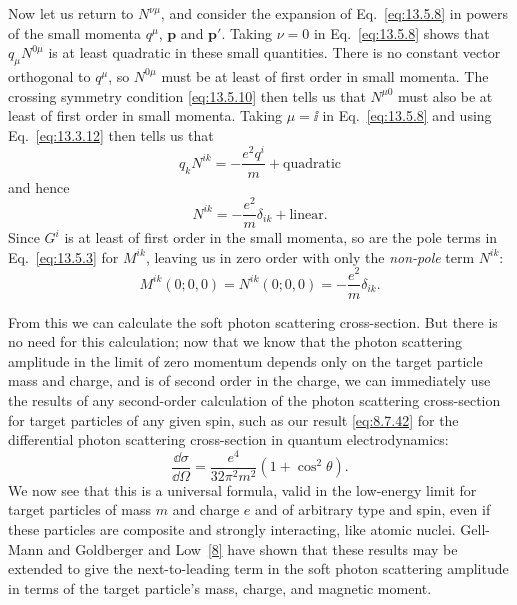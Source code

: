 Now let us return to $N^{\nu\mu}$, and consider the expansion of Eq.~\eqref{eq:13.5.8} in
powers of the small momenta $q^\mu$, $\mathbf p$ and $\mathbf p'$. Taking $\nu=0$ in Eq.~\eqref{eq:13.5.8}
shows that $q_\mu N^{0\mu}$ is at least quadratic in these small quantities. There is
no constant vector orthogonal to $q^\mu$, so $N^{0\mu}$ must be at least of first order
in small momenta. The crossing symmetry condition \eqref{eq:13.5.10} then tells
us that $N^{\mu0}$ must also be at least of first order in small momenta. Taking
$\mu=\ii$ in Eq.~\eqref{eq:13.5.8} and using Eq.~\eqref{eq:13.3.12} then tells us that
\begin{equation*}
q_kN^{ik}=-\frac{e^2q^i}{m}+\text{quadratic}
\end{equation*}
and hence
\begin{equation}
N^{ik}=-\frac{e^2}{m}\delta_{ik}+\text{linear}.
\tag{13.5.13}\label{eq:13.5.13}
\end{equation}
Since $G^i$ is at least of first order in the small momenta, so are the pole
terms in Eq.~\eqref{eq:13.5.3} for $M^{ik}$, leaving us in zero order with only the \emph{non-pole}
term $N^{ik}$:
\begin{equation}
M^{ik}(0;0,0)=N^{ik}(0;0,0)=-\frac{e^2}{m}\delta_{ik}.
\tag{13.5.14}\label{eq:13.5.14}
\end{equation}

From this we can calculate the soft photon scattering cross-section. But
there is no need for this calculation; now that we know that the photon
scattering amplitude in the limit of zero momentum depends only on the
target particle mass and charge, and is of second order in the charge,
we can immediately use the results of any second-order calculation of the
photon scattering cross-section for target particles of any given spin, such
as our result \eqref{eq:8.7.42} for the differential photon scattering cross-section in
quantum electrodynamics:
\begin{equation}
\frac{\dd\sigma}{\dd\Omega}=\frac{e^4}{32\pi^2m^2}(1+\cos^2\theta).
\tag{13.5.15}\label{eq:13.5.15}
\end{equation}
We now see that this is a universal formula, valid in the low-energy limit
for target particles of mass $m$ and charge $e$ and of arbitrary type and
spin, even if these particles are composite and strongly interacting, like
atomic nuclei. Gell-Mann and Goldberger and Low~\hyperref[ref:13.8]{[8]} have shown that
these results may be extended to give the next-to-leading term in the soft
photon scattering amplitude in terms of the target particle's mass, charge,
and magnetic moment.

